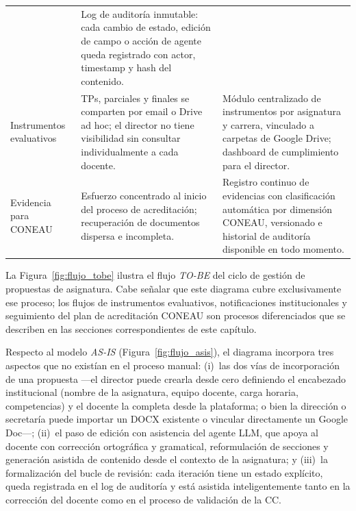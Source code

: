 \begin{longtable}{p{3cm} p{5cm} p{7cm}}
  & Log de auditoría inmutable: cada cambio de estado,
    edición de campo o acción de agente queda registrado
    con actor, timestamp y hash del contenido. \\
\arrayrulecolor{gray!35}\hline\arrayrulecolor{black}
Instrumentos evaluativos
  & TPs, parciales y finales se comparten por email o Drive
    ad hoc; el director no tiene visibilidad sin consultar
    individualmente a cada docente.
  & Módulo centralizado de instrumentos por asignatura
    y carrera, vinculado a carpetas de Google Drive;
    dashboard de cumplimiento para el director. \\
\arrayrulecolor{gray!35}\hline\arrayrulecolor{black}
Evidencia para CONEAU
  & Esfuerzo concentrado al inicio del proceso de acreditación;
    recuperación de documentos dispersa e incompleta.
  & Registro continuo de evidencias con clasificación
    automática por dimensión CONEAU, versionado
    e historial de auditoría disponible en todo momento. \\
\end{longtable}

La Figura~\ref{fig:flujo_tobe} ilustra el flujo \textit{TO-BE} del ciclo de gestión
de propuestas de asignatura.
Cabe señalar que este diagrama cubre exclusivamente ese proceso;
los flujos de instrumentos evaluativos, notificaciones institucionales y seguimiento
del plan de acreditación CONEAU son procesos diferenciados que se describen
en las secciones correspondientes de este capítulo.

Respecto al modelo \textit{AS-IS} (Figura~\ref{fig:flujo_asis}), el diagrama
incorpora tres aspectos que no existían en el proceso manual:
(i)~las dos vías de incorporación de una propuesta ---el director puede crearla
desde cero definiendo el encabezado institucional (nombre de la asignatura, equipo
docente, carga horaria, competencias) y el docente la completa desde la plataforma;
o bien la dirección o secretaría puede importar un DOCX existente o vincular
directamente un Google Doc---;
(ii)~el paso de edición con asistencia del agente LLM, que apoya al docente
con corrección ortográfica y gramatical, reformulación de secciones y generación
asistida de contenido desde el contexto de la asignatura; y
(iii)~la formalización del bucle de revisión: cada iteración tiene un estado
explícito, queda registrada en el log de auditoría y está asistida inteligentemente
tanto en la corrección del docente como en el proceso de validación de la CC.


